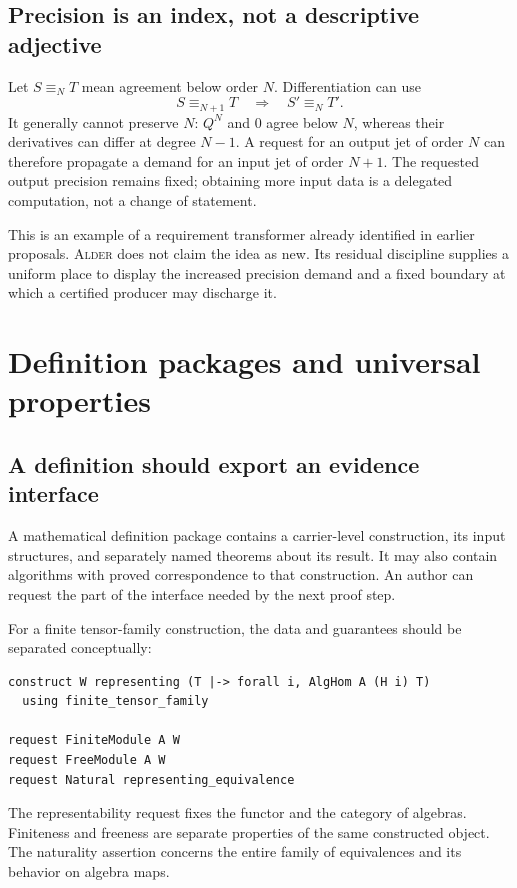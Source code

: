 \documentclass[11pt,a4paper]{article}
\newcommand{\Alder}{\textsc{Alder}}
\theoremstyle{plain}
\theoremstyle{definition}
\theoremstyle{remark}
\begin{document}
\subsection{Precision is an index, not a descriptive adjective}
Let $S\equiv_N T$ mean agreement below order $N$. Differentiation can use
\[
 S\equiv_{N+1}T\quad\Longrightarrow\quad S'\equiv_N T'.
\]
It generally cannot preserve $N$: $Q^N$ and $0$ agree below $N$, whereas their derivatives can differ at degree $N-1$. A request for an output jet of order $N$ can therefore propagate a demand for an input jet of order $N+1$. The requested output precision remains fixed; obtaining more input data is a delegated computation, not a change of statement.

This is an example of a requirement transformer already identified in earlier proposals. \Alder{} does not claim the idea as new. Its residual discipline supplies a uniform place to display the increased precision demand and a fixed boundary at which a certified producer may discharge it.

\section{Definition packages and universal properties}\label{sec:packages}

\subsection{A definition should export an evidence interface}
A mathematical definition package contains a carrier-level construction, its input structures, and separately named theorems about its result. It may also contain algorithms with proved correspondence to that construction. An author can request the part of the interface needed by the next proof step.

For a finite tensor-family construction, the data and guarantees should be separated conceptually:
\Needspace{128pt}
\begin{lstlisting}
construct W representing (T |-> forall i, AlgHom A (H i) T)
  using finite_tensor_family

request FiniteModule A W
request FreeModule A W
request Natural representing_equivalence
\end{lstlisting}
The representability request fixes the functor and the category of algebras. Finiteness and freeness are separate properties of the same constructed object. The naturality assertion concerns the entire family of equivalences and its behavior on algebra maps.
\end{document}
